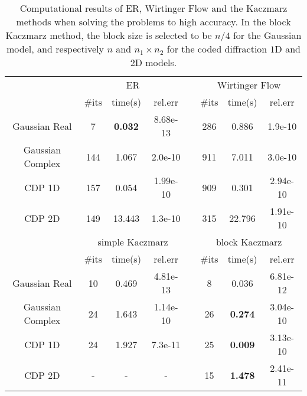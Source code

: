 \begin{table}[htp]
\centering
\caption{Computational results of ER, Wirtinger Flow and the Kaczmarz methods when solving the problems 
to high accuracy. In the block Kaczmarz method, the block size is selected to be $n/4$ for the Gaussian model, and respectively $n$ and $n_1\times n_2$ for the coded 
diffraction $1$D and $2$D models.}
\label{table}
\vspace{0.2cm}
\begin{tabular}{cccccccc}
\hline
& \multicolumn{3}{c}{ER} & &\multicolumn{3}{c}{Wirtinger Flow}\\
\cline{2-4}\cline{6-8}
& \#its & time(s) & rel.err &&\#its & time(s)  & rel.err\\
\hline
Gaussian Real & 7& \textbf{0.032} & 8.68e-13 && 286&0.886&1.9e-10  \\
Gaussian Complex &144 &1.067 &2.0e-10 & & 911&7.011 &3.0e-10 \\
CDP 1D &157 &0.054 &1.99e-10 & &909 &0.301 & 2.94e-10\\
CDP 2D & 149&13.443 &1.3e-10 & &315 &22.796 & 1.91e-10\\
\hline
& \multicolumn{3}{c}{simple Kaczmarz} & &\multicolumn{3}{c}{block Kaczmarz}\\
\cline{2-4}\cline{6-8}
& \#its & time(s)  & rel.err &&\#its & time(s) & rel.err\\
\hline
Gaussian Real &10 &0.469 &4.81e-13& & 8& 0.036& 6.81e-12 \\
Gaussian Complex & 24&1.643 &1.14e-10 & & 26&\textbf{0.274}&3.04e-10  \\
CDP 1D & 24& 1.927&7.3e-11 & &25 & \textbf{0.009}&3.13e-10 \\
CDP 2D &- &- & -& &15 &\textbf{1.478} &2.41e-11 \\
\hline
\end{tabular}
\end{table}

